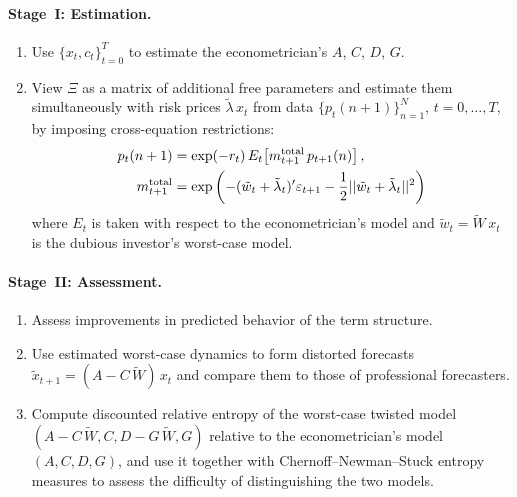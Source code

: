 \documentclass[12pt]{article}
\theoremstyle{definition}
\begin{document}
\paragraph{Stage~I: Estimation.}
\begin{enumerate}
\item Use $\{x_t, c_t\}_{t=0}^T$ to estimate the econometrician's
      $A$, $C$, $D$, $G$.
\item View $\Xi$ as a matrix of additional free parameters and estimate
      them simultaneously with risk prices $\tilde\lambda\, x_t$ from
      data $\{p_t(n+1)\}_{n=1}^N$, $t = 0, \ldots, T$, by imposing
      cross-equation restrictions:
\begin{align}
p_t(n+1) &= \exp(-r_t)\, E_t\!\left[
    m_{t+1}^{\rm total} \, %
    p_{t+1}(n)\right], \label{eq:szoke-pricing}\\
m_{t+1}^{\rm total} &= \exp\left( - (\tilde w_t +\tilde \lambda_t)' \varepsilon_{t+1} - \frac{1}{2} || \tilde w_t +\tilde \lambda_t||^2 \right)
\notag
%
\end{align}
where $E_t$ is taken with respect to the econometrician's model and
$\tilde w_t = \tilde W\, x_t$ is the dubious investor's worst-case
model.
\end{enumerate}

\paragraph{Stage~II: Assessment.}
\begin{enumerate}
\item Assess improvements in predicted behavior of the term structure.
\item Use estimated worst-case dynamics to form distorted forecasts
      $\tilde x_{t+1} = (A - C\,\tilde W)\, x_t$ and compare them to
      those of professional forecasters.
\item Compute discounted relative entropy of the worst-case twisted
      model $(A - C\,\tilde W, C, D - G\,\tilde W, G)$ relative to the
      econometrician's model $(A,C,D,G)$, and use it together with
      Chernoff--Newman--Stuck entropy measures to assess the difficulty
      of distinguishing the two models.
\end{enumerate}
\end{document}
